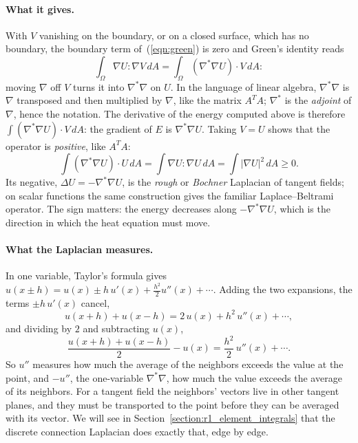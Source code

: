 \paragraph{What it gives.} With $V$ vanishing on the boundary, or on a closed surface, which has no boundary, the boundary term of~(\ref{eqn:green}) is zero and Green's identity reads
\begin{equation*}
\int_\Omega \nabla U : \nabla V\, dA = \int_\Omega (\nabla^* \nabla U) \cdot V\, dA :
\end{equation*}
moving $\nabla$ off $V$ turns it into $\nabla^*\nabla$ on $U$. In the language of linear algebra, $\nabla^*\nabla$ is $\nabla$ transposed and then multiplied by $\nabla$, like the matrix $A^T A$; $\nabla^*$ is the \emph{adjoint} of $\nabla$, hence the notation. The derivative of the energy computed above is therefore $\int (\nabla^*\nabla U)\cdot V\, dA$: the gradient of $E$ is $\nabla^*\nabla U$. Taking $V = U$ shows that the operator is \emph{positive}, like $A^TA$:
\begin{equation*}
\int (\nabla^* \nabla U) \cdot U\, dA = \int \nabla U : \nabla U\, dA = \int |\nabla U|^2\, dA \geq 0 .
\end{equation*}
Its negative, $\Delta U = -\nabla^* \nabla U$, is the \emph{rough} or \emph{Bochner} Laplacian of tangent fields; on scalar functions the same construction gives the familiar Laplace--Beltrami operator. The sign matters: the energy decreases along $-\nabla^* \nabla U$, which is the direction in which the heat equation must move.

\paragraph{What the Laplacian measures.} In one variable, Taylor's formula gives $u(x \pm h) = u(x) \pm h\, u'(x) + \frac{h^2}{2} u''(x) + \cdots$. Adding the two expansions, the terms $\pm h\,u'(x)$ cancel,
\begin{equation*}
u(x + h) + u(x - h) = 2\,u(x) + h^2\, u''(x) + \cdots ,
\end{equation*}
and dividing by $2$ and subtracting $u(x)$,
\begin{equation*}
\frac{u(x + h) + u(x - h)}{2} - u(x) = \frac{h^2}{2}\, u''(x) + \cdots .
\end{equation*}
So $u''$ measures how much the average of the neighbors exceeds the value at the point, and $-u''$, the one-variable $\nabla^*\nabla$, how much the value exceeds the average of its neighbors. For a tangent field the neighbors' vectors live in other tangent planes, and they must be transported to the point before they can be averaged with its vector. We will see in Section~\ref{section:r1_element_integrals} that the discrete connection Laplacian does exactly that, edge by edge.

